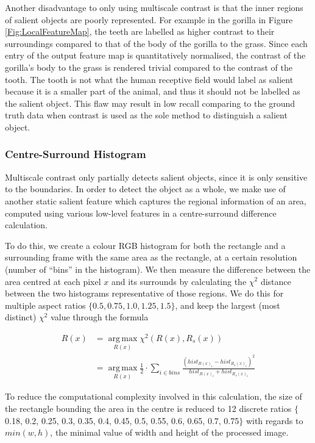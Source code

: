 \documentclass[10pt,twocolumn,letterpaper]{article}
\DeclareMathOperator*{\argmax}{arg\,max}
\newcommand{\SUM}{\sum\limits}
\begin{document}
Another disadvantage to only using multiscale contrast is that the inner regions of salient objects are poorly represented.  For example in the gorilla in Figure \ref{Fig:LocalFeatureMap}, the teeth are labelled as higher contrast to their surroundings compared to that of the body of the gorilla to the grass. Since each entry of the output feature map is quantitatively normalised, the contrast of the gorilla's body to the grass is rendered trivial compared to the contrast of the tooth. The tooth is not what the human receptive field would label as salient because it is a smaller part of the animal, and thus it should not be labelled as the salient object. This flaw may result in low recall comparing to the ground truth data when contrast is used as the sole method to distinguish a salient object.

\subsubsection{Centre-Surround Histogram}

Multiscale contrast only partially detects salient objects, since it is only sensitive to the boundaries. In order to detect the object as a whole, we make use of another static salient feature which captures the regional information of an area, computed using various low-level features in a centre-surround difference calculation. 

To do this, we create a colour RGB histogram for both the rectangle and a surrounding frame with the same area as the rectangle, at a certain resolution (number of ``bins'' in the histogram). We then measure the difference between the area centred at each pixel $x$ and its surrounds by calculating the $\chi^2$ distance between the two histograms representative of those regions.  We do this for multiple aspect ratios $\{ 0.5, 0.75, 1.0, 1.25, 1.5\}$, and keep the largest (most distinct) $\chi^2$ value through the formula

\begin{align*}
R(x) &= \argmax\limits_{R(x)}\chi^2(R(x), R_s(x)) \\ &=\argmax\limits_{R(x)}\frac{1}{2}\cdot\SUM_{i\in bins}\frac{(hist_{R(x)_i}-hist_{R_s(x)_i})^2}{hist_{R(x)_i}+hist_{R_s(x)_i}}
\end{align*}

To reduce the computational complexity involved in this calculation, the size of the rectangle bounding the area in the centre is reduced to 12 discrete ratios $\{$0.18, 0.2, 0.25, 0.3, 0.35, 0.4, 0.45, 0.5, 0.55, 0.6, 0.65, 0.7, 0.75$\}$ with regards to  $min(w,h)$, the minimal value of width and height of the processed image.
\end{document}
